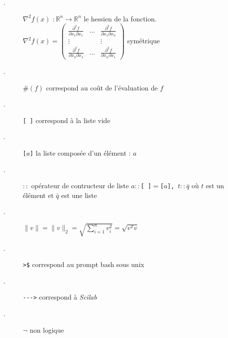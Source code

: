 \documentclass[caractereUtf,maitrise]{style/scienceUdeS}
\begin{document}
{\begin{description}
  \item[.]$\nabla^2 f(x)$ $: \mathbb{R}^n\rightarrow \mathbb{R}^n$ le hessien de la fonction.\\
$\nabla^2 f(x)= \left( \begin{array}{ccc}
 \frac{\partial^2 f}{\partial x_1\partial x_1} & \hdots & \frac{\partial^2 f}{\partial x_1\partial x_n}\\
 \vdots &  & \vdots \\
  \frac{\partial^2 f}{\partial x_n\partial x_1} & \hdots & \frac{\partial^2 f}{\partial x_n\partial x_1}
\end{array}
\right)$ sym\'etrique
 \item[.]$\#(f)$ correspond au coût de l'\'evaluation de $f$
 \item[.]{\tt [ ]} correspond \`a la liste vide
 \item[.]{\tt [$a$]} la liste compos\'ee d'un \'el\'ement : $a$
 \item[.]$::$ op\'erateur de contructeur de liste {\tt $a::$[ ]$=$[$a$], $t::\bar{q}$} o\`u $t$ est un \'el\'ement et $\bar{q}$ est une liste
 \item[.]$\lVert v\rVert=\lVert v\rVert_{2}=\sqrt{\sum_{i=1}^{n}v_i^2}=\sqrt{v^Tv}$
 \item[.]{\tt >\$} correspond au prompt bash sous unix
 \item[.] \verb!--->! correspond \`a {\it Scilab}
 \item[.] $\neg$ non logique
 

  \end{description}
}

\modeFrancais{}
\enteteDeLaThese{}
\renewcommand{\chaptermark}[1]{\markboth{\textsc{\chaptername\ \thechapter.\ #1}}{}}
\renewcommand{\sectionmark}[1]{\markright{\textsc{\thesection. #1}}	}
    

\modeFrancais{}
% 
\Introduction
\end{document}
